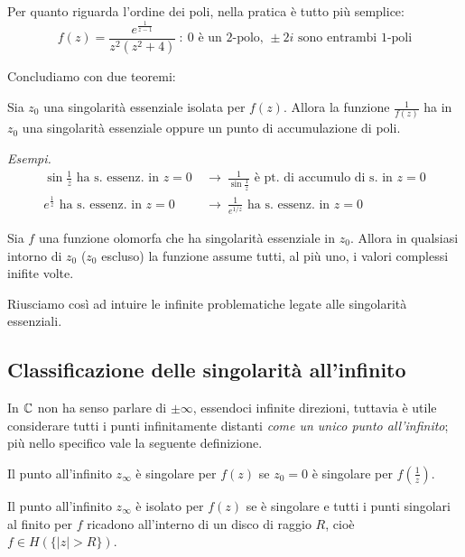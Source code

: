Per quanto riguarda l'ordine dei poli, nella pratica è tutto più semplice: 
\begin{equation*}
f(z)=\frac{e^{\frac{1}{z-1}}}{z^2(z^2+4)}\ :\ 0\text{ è un 2-polo, }\pm 2i\text{ sono entrambi 1-poli}
\end{equation*}

Concludiamo con due teoremi:
\begin{thm}
 Sia $z_{0}$ una singolarità essenziale isolata per $f(z)$. Allora la funzione $\frac{1}{f(z)}$ ha in $z_{0}$ una singolarità essenziale oppure un punto di accumulazione di poli.
\end{thm}

\textit{Esempi.}\leavevmode
\begin{align*}
\sin\frac{1}{z}\text{ ha s. essenz. in }z=0 \  &\longrightarrow\ \frac{1}{\sin\frac{1}{z}}\text{ è pt. di accumulo di s. in }z=0 \\
e^{\frac{1}{z}}\text{ ha s. essenz. in }z=0 \  &\longrightarrow\  \frac{1}{e^{1/z}}\text{ ha s. essenz. in }z=0
\end{align*}

\begin{thm}[di Picard]
Sia $f$ una funzione olomorfa che ha singolarità essenziale in $z_0$. Allora in qualsiasi intorno di $z_0$ ($z_0$ escluso) la funzione assume tutti, al più uno, i valori complessi inifite volte.
\end{thm}

Riusciamo così ad intuire le infinite problematiche legate alle singolarità essenziali.

\subsection{Classificazione delle singolarità all'infinito}

In $\mathbb{C}$ non ha senso parlare di $\pm \infty $, essendoci infinite direzioni, tuttavia è utile considerare tutti i punti infinitamente distanti \textit{come un unico punto all'infinito}; più nello specifico vale la seguente definizione.
\begin{defn}
 Il punto all'infinito $z_{\infty}$ è singolare per $f(z)$ se $z_{0} = 0$ è singolare per $f\left(\frac{1}{z}\right)$.
\end{defn}

\begin{defn}
 Il punto all'infinito $z_{\infty}$ è isolato per $f(z)$ se è singolare e tutti i punti singolari al finito per $f$ ricadono all'interno di un disco di raggio $R$, cioè $f\in H(\{|z|>R\})$.
\end{defn}

